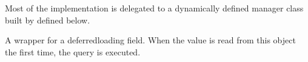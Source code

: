 \documentclass[letterpaper,10pt,french]{sphinxmanual}
\begin{document}
\begin{fulllineitems}
\begin{fulllineitems}
\sphinxAtStartPar
Most of the implementation is delegated to a dynamically defined manager
class built by  defined below.

\end{fulllineitems}


\begin{fulllineitems}
\label{\detokenize{main/model:main.models.Ue.type}}
\pysigstartsignatures
{}
\pysigstopsignatures
\sphinxAtStartPar
A wrapper for a deferred\sphinxhyphen{}loading field. When the value is read from this
object the first time, the query is executed.

\end{fulllineitems}


\end{fulllineitems}

\end{document}
